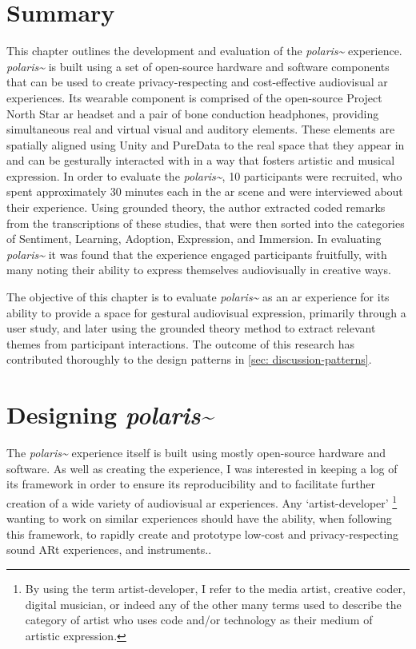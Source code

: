    
\clearpage
   
\section{Summary}\label{sec: polaris-summary}
This chapter outlines the development and evaluation of the \textit{polaris\textasciitilde{}} experience. \textit{polaris\textasciitilde{}} is built using a set of open-source hardware and software components that can be used to create privacy-respecting and cost-effective audiovisual \gls{ar} experiences. Its wearable component is comprised of the open-source Project North Star \gls{ar} headset and a pair of bone conduction headphones, providing simultaneous real and virtual visual and auditory elements. These elements are spatially aligned using Unity and PureData to the real space that they appear in and can be gesturally interacted with in a way that fosters artistic and musical expression. In order to evaluate the \textit{polaris\textasciitilde{}}, 10 participants were recruited, who spent approximately 30 minutes each in the \gls{ar} scene and were interviewed about their experience. Using grounded theory, the author extracted coded remarks from the transcriptions of these studies, that were then sorted into the categories of Sentiment, Learning, Adoption, Expression, and Immersion. In evaluating \textit{polaris\textasciitilde{}} it was found that the experience engaged participants fruitfully, with many noting their ability to express themselves audiovisually in creative ways.

The objective of this chapter is to evaluate \textit{polaris\textasciitilde{}} as an \gls{ar} experience for its ability to provide a space for gestural audiovisual expression, primarily through a user study, and later using the grounded theory method to extract relevant themes from participant interactions. The outcome of this research has contributed thoroughly to the design patterns in \autoref{sec: discussion-patterns}.



\section{Designing \textit{polaris\textasciitilde{}}}\label{sec: polaris-framework}
The \textit{polaris\textasciitilde{}} experience itself is built using mostly open-source hardware and software. As well as creating the experience, I was interested in keeping a log of its framework in order to ensure its reproducibility and to facilitate further creation of a wide variety of audiovisual \gls{ar} experiences. Any `artist-developer' \footnote{By using the term artist-developer, I refer to the media artist, creative coder, digital musician, or indeed any of the other many terms used to describe the category of artist who uses code and/or technology as their medium of artistic expression.} wanting to work on similar experiences should have the ability, when following this framework, to rapidly create and prototype low-cost and privacy-respecting sound ARt experiences, and instruments..

